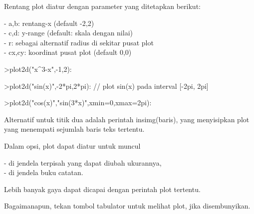 \documentclass[a4paper,10pt]{article}
\begin{document}
\begin{eulernotebook}
\begin{eulercomment}
\begin{eulercomment}
\begin{eulercomment}
\begin{eulercomment}
\begin{eulercomment}
\begin{eulercomment}
\begin{eulercomment}
\begin{eulercomment}
\begin{eulercomment}
Rentang plot diatur dengan parameter yang ditetapkan berikut:

- a,b: rentang-x (default -2,2)\\
- c,d: y-range (default: skala dengan nilai)\\
- r: sebagai alternatif radius di sekitar pusat plot\\
- cx,cy: koordinat pusat plot (default 0,0)
\end{eulercomment}
\begin{eulerprompt}
>plot2d("x^3-x",-1,2):
\end{eulerprompt}
\begin{eulerprompt}
>plot2d("sin(x)",-2*pi,2*pi): // plot sin(x) pada interval [-2pi, 2pi]
\end{eulerprompt}
\begin{eulerprompt}
>plot2d("cos(x)","sin(3*x)",xmin=0,xmax=2pi):
\end{eulerprompt}
\begin{eulercomment}
Alternatif untuk titik dua adalah perintah insimg(baris), yang
menyisipkan plot yang menempati sejumlah baris teks tertentu.

Dalam opsi, plot dapat diatur untuk muncul

- di jendela terpisah yang dapat diubah ukurannya,\\
- di jendela buku catatan.

Lebih banyak gaya dapat dicapai dengan perintah plot tertentu.

Bagaimanapun, tekan tombol tabulator untuk melihat plot, jika
disembunyikan.


\end{eulercomment}
\end{eulercomment}
\end{eulercomment}
\end{eulercomment}
\end{eulercomment}
\end{eulercomment}
\end{eulercomment}
\end{eulercomment}
\end{eulercomment}
\end{eulernotebook}
\end{document}
